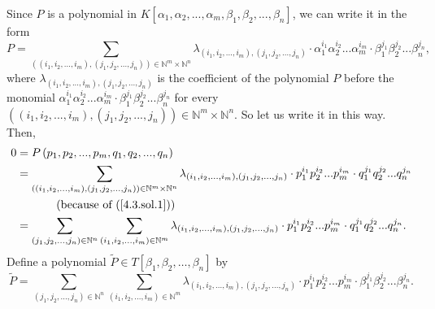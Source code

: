 \documentclass[numbers=enddot,12pt,final,onecolumn,notitlepage]{scrartcl}%
\begin{document}
Since $P$ is a polynomial in $K\left[  \alpha_{1},\alpha_{2},...,\alpha
_{m},\beta_{1},\beta_{2},...,\beta_{n}\right]  $, we can write it in the form%
\begin{equation}
P=\sum\limits_{\left(  \left(  i_{1},i_{2},...,i_{m}\right)  ,\left(
j_{1},j_{2},...,j_{n}\right)  \right)  \in\mathbb{N}^{m}\times\mathbb{N}^{n}%
}\lambda_{\left(  i_{1},i_{2},...,i_{m}\right)  ,\left(  j_{1},j_{2}%
,...,j_{n}\right)  }\cdot\alpha_{1}^{i_{1}}\alpha_{2}^{i_{2}}...\alpha
_{m}^{i_{m}}\cdot\beta_{1}^{j_{1}}\beta_{2}^{j_{2}}...\beta_{n}^{j_{n}},
\label{4.3.sol.1}%
\end{equation}
where $\lambda_{\left(  i_{1},i_{2},...,i_{m}\right)  ,\left(  j_{1}%
,j_{2},...,j_{n}\right)  }$ is the coefficient of the polynomial $P$ before
the monomial $\alpha_{1}^{i_{1}}\alpha_{2}^{i_{2}}...\alpha_{m}^{i_{m}}%
\cdot\beta_{1}^{j_{1}}\beta_{2}^{j_{2}}...\beta_{n}^{j_{n}}$ for every
$\left(  \left(  i_{1},i_{2},...,i_{m}\right)  ,\left(  j_{1},j_{2}%
,...,j_{n}\right)  \right)  \in\mathbb{N}^{m}\times\mathbb{N}^{n}$. So let us
write it in this way. Then,%
\begin{align}
0  &  =P\left(  p_{1},p_{2},...,p_{m},q_{1},q_{2},...,q_{n}\right) \nonumber\\
&  =\sum\limits_{\left(  \left(  i_{1},i_{2},...,i_{m}\right)  ,\left(
j_{1},j_{2},...,j_{n}\right)  \right)  \in\mathbb{N}^{m}\times\mathbb{N}^{n}%
}\lambda_{\left(  i_{1},i_{2},...,i_{m}\right)  ,\left(  j_{1},j_{2}%
,...,j_{n}\right)  }\cdot p_{1}^{i_{1}}p_{2}^{i_{2}}...p_{m}^{i_{m}}\cdot
q_{1}^{j_{1}}q_{2}^{j_{2}}...q_{n}^{j_{n}}\nonumber\\
&  \ \ \ \ \ \ \ \ \ \ \left(  \text{because of (\ref{4.3.sol.1})}\right)
\nonumber\\
&  =\sum\limits_{\left(  j_{1},j_{2},...,j_{n}\right)  \in\mathbb{N}^{n}}%
\sum\limits_{\left(  i_{1},i_{2},...,i_{m}\right)  \in\mathbb{N}^{m}}%
\lambda_{\left(  i_{1},i_{2},...,i_{m}\right)  ,\left(  j_{1},j_{2}%
,...,j_{n}\right)  }\cdot p_{1}^{i_{1}}p_{2}^{i_{2}}...p_{m}^{i_{m}}\cdot
q_{1}^{j_{1}}q_{2}^{j_{2}}...q_{n}^{j_{n}}. \label{4.3.sol.1a}%
\end{align}
Define a polynomial $\widetilde{P}\in T\left[  \beta_{1},\beta_{2}%
,\ldots,\beta_{n}\right]  $ by%
\begin{equation}
\widetilde{P}=\sum\limits_{\left(  j_{1},j_{2},...,j_{n}\right)  \in
\mathbb{N}^{n}}\sum\limits_{\left(  i_{1},i_{2},...,i_{m}\right)
\in\mathbb{N}^{m}}\lambda_{\left(  i_{1},i_{2},...,i_{m}\right)  ,\left(
j_{1},j_{2},...,j_{n}\right)  }\cdot p_{1}^{i_{1}}p_{2}^{i_{2}}...p_{m}%
^{i_{m}}\cdot\beta_{1}^{j_{1}}\beta_{2}^{j_{2}}...\beta_{n}^{j_{n}}.
\label{4.3.sol.1b}%
\end{equation}
\end{document}
